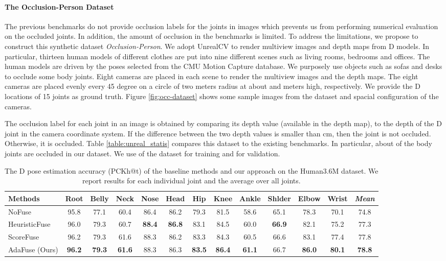 \paragraph{The Occlusion-Person Dataset}
The previous benchmarks do not provide occlusion labels for the joints in images which prevents us from performing numerical evaluation on the occluded joints. In addition, the amount of occlusion in the benchmarks is limited. To address the limitations, we propose to construct this synthetic dataset \emph{Occlusion-Person}. We adopt UnrealCV \citep{qiu2017unrealcv} to render multiview images and depth maps from D models. In particular, thirteen human models of different clothes are put into nine different scenes such as living rooms, bedrooms and offices. The human models are driven by the poses selected from the CMU Motion Capture database. We purposely use objects such as sofas and desks to occlude some body joints. Eight cameras are placed in each scene to render the multiview images and the depth maps. {The eight cameras are placed evenly  
every 45 degree on a circle of two meters radius at about  and  meters high, respectively.} We provide the D locations of 15 joints as ground truth. Figure \ref{fig:occ-dataset} shows some sample images from the dataset and spacial configuration of the cameras.


The occlusion label for each joint in an image is obtained by comparing its depth value (available in the depth map), to the depth of the D joint in the camera coordinate system. If the difference between the two depth values is smaller than cm, then the joint is not occluded. Otherwise, it is occluded.  Table \ref{table:unreal_statis} compares this dataset to the existing benchmarks. In particular, about  of the body joints are occluded in our dataset. We use  of the dataset for training and  for validation.


\begin{table*}[ht]
\centering
\caption{The D pose estimation accuracy (PCKh@t) of the baseline methods and our approach on the Human3.6M dataset. We report results for each individual joint and the average over all joints. }
\label{table:pck_h36m}
\begin{tabular}{l|ccccccccccc|c}
\toprule
  Methods    & Root  & Belly & Neck  & Nose  & Head  & Hip  & Knee  & Ankle  & Shlder   & Elbow   & Wrist  & \emph{Mean}   \\ \hline
 NoFuse        & 95.8 & 77.1 & 60.4 & 86.4 & 86.2 & 79.3 & 81.5 & 58.6 & 65.1 & 78.3 & 70.1 & 74.8 \\
                     HeuristicFuse & 96.0 & 79.3 & 60.7 & \textbf{88.4} & \textbf{86.8} & 83.1 & 84.5 & 60.0 & \textbf{66.9} & 82.1 & 75.2 & 77.3 \\
                     ScoreFuse     & 96.2 & 79.3 & 61.6 & 88.3 & 86.2 & 83.3 & 84.3 & 60.5 & 66.6 & 83.1 & 77.4 & 77.8 \\
                     AdaFuse (Ours)       & \textbf{96.2} & \textbf{79.3} & \textbf{61.6} & 88.3 & 86.3 & \textbf{83.5} & \textbf{86.4} & \textbf{61.1} & 66.7 & \textbf{86.0} & \textbf{80.1} & \textbf{78.8} \\
\toprule
\end{tabular}
\end{table*}

